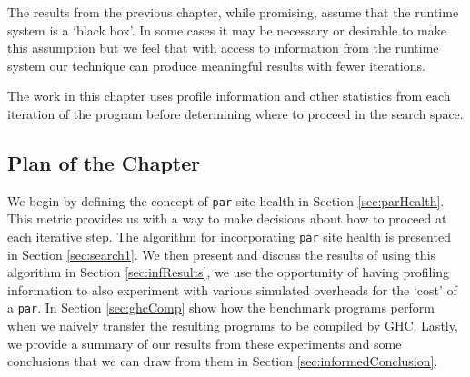 The results from the previous chapter, while promising, assume that the runtime
system is a `black box'. In some cases it may be necessary or desirable to make
this assumption but we feel that with access to information from the runtime
system our technique can produce meaningful results with fewer iterations.

The work in this chapter uses profile information and other statistics from
each iteration of the program before determining where to proceed in the search
space.

\subsection*{Plan of the Chapter}

We begin by defining the concept of \verb|par| site health in Section
\ref{sec:parHealth}.  This metric provides us with a way to make decisions
about how to proceed at each iterative step. The algorithm for incorporating
\verb|par| site health is presented in Section \ref{sec:search1}. We then
present and discuss the results of using this algorithm in Section
\ref{sec:infResults}, we use the opportunity of having profiling information to
also experiment with various simulated overheads for the `cost' of a
\verb|par|. In Section \ref{sec:ghcComp} show how the benchmark programs
perform when we naively transfer the resulting programs to be compiled by GHC.
Lastly, we provide a summary of our results from these experiments and some
conclusions that we can draw from them in Section \ref{sec:informedConclusion}.

